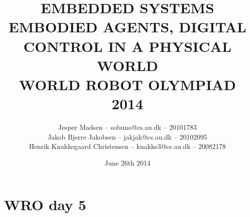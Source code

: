 \documentclass[a4paper,11pt,article,oneside]{memoir}
\title{EMBEDDED SYSTEMS\\\small{EMBODIED AGENTS, DIGITAL CONTROL IN A PHYSICAL WORLD\\WORLD ROBOT OLYMPIAD 2014}}
\author{Jesper Madsen -- sobuno@cs.au.dk -- 20101783\\Jakob Bjerre Jakobsen -- jakjak@cs.au.dk -- 20102095\\Henrik Knakkegaard Christensen -- knakke3@cs.au.dk -- 20082178}
\date{June 26th 2014}
\begin{document}
\maketitle
\clearpage
%

%

%

%

\chapter*{WRO day 5}


%

%

%

%

%
\end{document}
